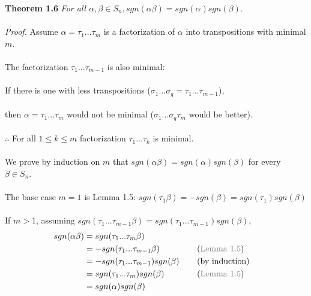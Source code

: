 \documentclass{article}
\begin{document}
\begin{redrules}\color{red}
\textbf{Theorem 1.6} \textit{For all \(\alpha,\beta\in S_n, sgn(\alpha\beta)=sgn(\alpha)sgn(\beta).\)}\color{black}\\\\
\textit{Proof.} Assume \(\alpha=\tau_1...\tau_m\) is a factorization of \(\alpha\) into transpositions with minimal \(m\).\\\\
\null\qquad The factorization \(\tau_1...\tau_{m-1}\) is also minimal:\\\\
\null\qquad If there is one with less transpositions (\(\sigma_1...\sigma_q=\tau_1...\tau_{m-1}\)),\\\\
\null\qquad then \(\alpha=\tau_1...\tau_m\) would not be minimal (\(\sigma_1...\sigma_q\tau_m\) would be better).\\\\
\null\qquad\(\therefore\) For all \(1\le k\le m\) factorization \(\tau_1...\tau_k\) is minimal.\\\\
We prove by induction on \(m\) that \(sgn(\alpha\beta)=sgn(\alpha)sgn(\beta)\) for every \(\beta\in S_n\).\\\\
The base case \(m=1\) is \color{gray}Lemma 1.5\color{black}: \(sgn(\tau_1\beta)=-sgn(\beta)=sgn(\tau_1)sgn(\beta)\)\\\\
If \(m>1\), assuming \(sgn(\tau_1...\tau_{m-1}\beta)=sgn(\tau_1...\tau_{m-1})sgn(\beta)\),
\begin{alignat*}{2}
sgn(\alpha\beta)&=sgn(\tau_1...\tau_m\beta)\\
&=-sgn(\tau_1...\tau_{m-1}\beta)&&(\text{\color{gray}Lemma 1.5\color{black}})\\
&=-sgn(\tau_1...\tau_{m-1})sgn(\beta)\;\;\;\;&&(\text{by induction})\\
&=sgn(\tau_1...\tau_m)sgn(\beta)&&(\text{\color{gray}Lemma 1.5\color{black}})\\
&=sgn(\alpha)sgn(\beta)
\end{alignat*}
\end{redrules}
\end{document}

